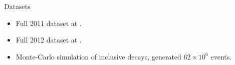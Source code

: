 \begin{frame}{Datasets}
\begin{itemize}
\item Full 2011 dataset at \tev.  \invfb
\item Full 2012 dataset at \tev.  \invfb
\item Monte-Carlo simulation of \chib inclusive decays, generated
$62\times10^6$ events.
\end{itemize}
\end{frame}
